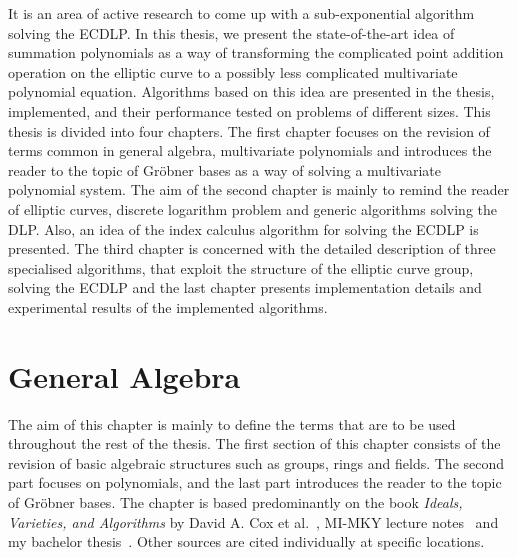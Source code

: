 \documentclass[thesis=M,english]{FITthesis}[2012/10/20]
\theoremstyle{remark}
\theoremstyle{definition}
\begin{document}
It is an area of active research to come up with a sub-exponential algorithm solving the ECDLP. In this thesis, we present the state-of-the-art idea of summation polynomials as a way of transforming the complicated point addition operation on the elliptic curve to a possibly less complicated multivariate polynomial equation. Algorithms based on this idea are presented in the thesis, implemented, and their performance tested on problems of different sizes. This thesis is divided into four chapters. The first chapter focuses on the revision of terms common in general algebra, multivariate polynomials and introduces the reader to the topic of Gröbner bases as a way of solving a multivariate polynomial system. The aim of the second chapter is mainly to remind the reader of elliptic curves, discrete logarithm problem and generic algorithms solving the DLP. Also, an idea of the index calculus algorithm for solving the ECDLP is presented. The third chapter is concerned with the detailed description of three specialised algorithms, that exploit the structure of the elliptic curve group, solving the ECDLP and the last chapter presents implementation details and experimental results of the implemented algorithms.

\chapter{General Algebra}\label{mathBG}
%
The aim of this chapter is mainly to define the terms that are to be used throughout the rest of the thesis. The first section of this chapter consists of the revision of basic algebraic structures such as groups, rings and fields. The second part focuses on polynomials, and the last part introduces the reader to the topic of Gröbner bases. The chapter is based predominantly on the book \textit{Ideals, Varieties, and Algorithms} by David A. Cox et al.~\cite{algGeom}, MI-MKY lecture notes~\cite{mky} and my bachelor thesis~\cite{myBP}. Other sources are cited individually at specific locations.
\end{document}
